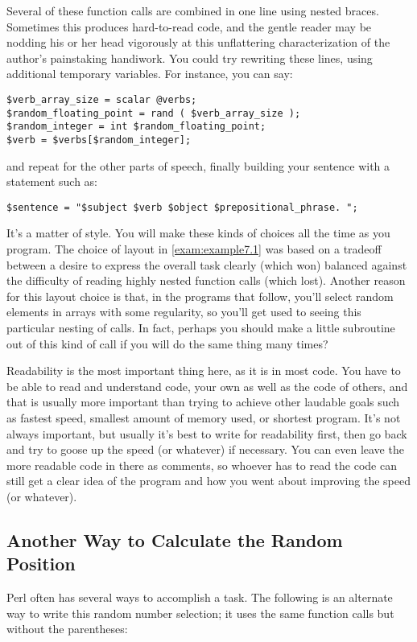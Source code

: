 Several of these function calls are combined in one line using nested braces. Sometimes this produces hard-to-read code, and the gentle reader may be nodding his or her head vigorously at this unflattering characterization of the author's painstaking handiwork. You could try rewriting these lines, using additional temporary variables. For instance, you can say:

\begin{lstlisting}
$verb_array_size = scalar @verbs;
$random_floating_point = rand ( $verb_array_size );
$random_integer = int $random_floating_point;
$verb = $verbs[$random_integer];
\end{lstlisting}

and repeat for the other parts of speech, finally building your sentence with a statement such as:

\begin{lstlisting}
$sentence = "$subject $verb $object $prepositional_phrase. ";
\end{lstlisting}

It's a matter of style. You will make these kinds of choices all the time as you program. The choice of layout in \autoref{exam:example7.1} was based on a tradeoff between a desire to express the overall task clearly (which won) balanced against the difficulty of reading highly nested function calls (which lost). Another reason for this layout choice is that, in the programs that follow, you'll select random elements in arrays with some regularity, so you'll get used to seeing this particular nesting of calls. In fact, perhaps you should make a little subroutine out of this kind of call if you will do the same thing many times?

Readability is the most important thing here, as it is in most code. You have to be able to read and understand code, your own as well as the code of others, and that is usually more important than trying to achieve other laudable goals such as fastest speed, smallest amount of memory used, or shortest program. It's not always important, but usually it's best to write for readability first, then go back and try to goose up the speed (or whatever) if necessary. You can even leave the more readable code in there as comments, so whoever has to read the code can still get a clear idea of the program and how you went about improving the speed (or whatever). 

\subsection{Another Way to Calculate the Random Position}
Perl often has several ways to accomplish a task. The following is an alternate way to write this random number selection; it uses the same function calls but without the parentheses:

